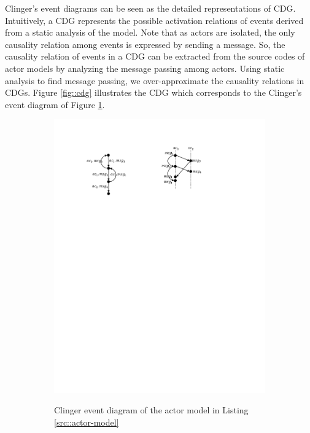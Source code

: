 Clinger's event diagrams can be seen as the detailed representations of CDG. Intuitively, a CDG represents the possible activation relations of events derived from a static analysis of the model. Note that as actors are isolated, the only causality relation among events is expressed by sending a message. So, the causality relation of events in a CDG can be extracted from the source codes of actor models by analyzing the message passing among actors. Using static analysis to find message passing, we  over-approximate the causality relations in CDGs. Figure \ref{fig::cdg} illustrates the CDG which corresponds to the Clinger's event diagram of Figure \ref{fig::clinger}.

\begin{figure}
\centering
\begin{subfigure}[b]{0.2\textwidth}
  \centering
  \small{
   \includegraphics[width=.8\textwidth]{resources/clinger.pdf}
  }
  \caption{Clinger event diagram of the actor model in Listing \ref{src::actor-model}}
  \label{fig::clinger}
\end{subfigure}
\qquad
\begin{subfigure}[b]{0.2\textwidth}


\end{subfigure}
\end{figure}
